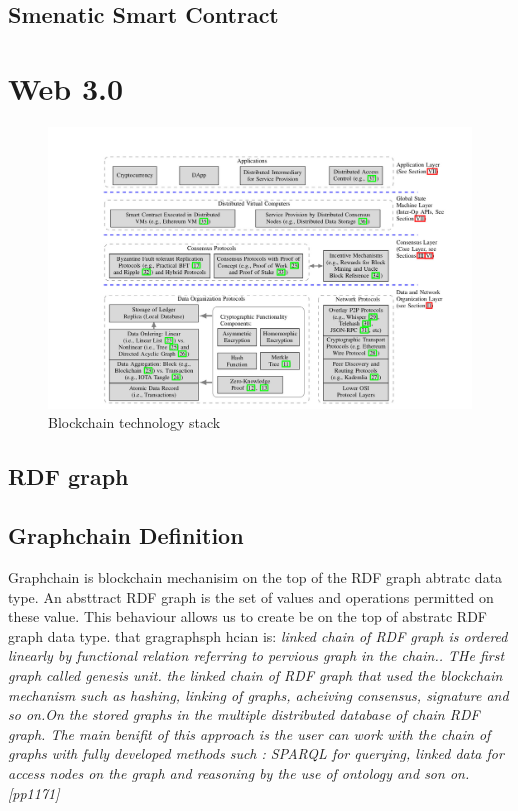 \subsection{Smenatic Smart Contract}

 \section{Web 3.0}
 
 
 
 
 \begin{center}
 	\begin{figure}[htb!]
 		
 		\begin{minipage}{0.55\linewidth}
 			\centering
 			\includegraphics[width=1.95\textwidth]{images/chap02_BC_Tec_Stack.jpg}
 		\end{minipage}
 		\caption[Blochchainktechnology stack]{Blockchain technology stack}
 		
 	\end{figure}
 	
 \end{center}

\subsection{RDF graph}
\subsection{Graphchain Definition} Graphchain is blockchain mechanisim on the top of the RDF graph abtratc data type. An absttract RDF graph is the set of values and operations permitted on these value. This behaviour allows us to create be on the top of abstratc RDF graph data type. 
that gragraphsph hcian is:
\textit{linked chain of RDF graph is ordered linearly by functional relation referring to pervious graph in the chain.. THe first graph called genesis unit. }
\textit{the linked chain of RDF graph that used the blockchain mechanism such as hashing, linking of graphs, acheiving consensus, signature and so on.On the stored graphs in the multiple distributed database of chain RDF graph. The main benifit of this approach is the user can work with the chain of graphs with fully developed methods such : SPARQL for querying, linked data for access nodes on the graph and reasoning by the use of ontology and son on.[pp1171] }

